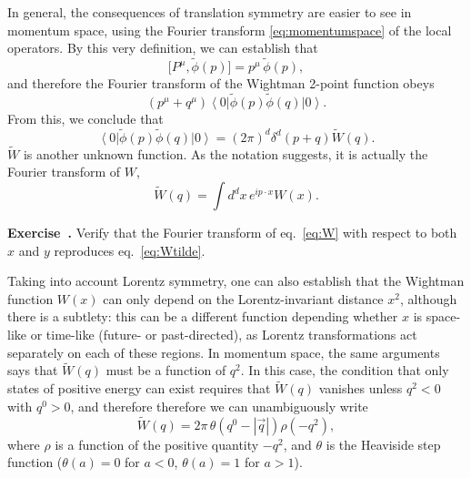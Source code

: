 \documentclass[a4paper,12pt]{article}
\newcommand{\ket}[1]{\left| #1 \right\rangle}
\newcommand{\bra}[1]{\left\langle #1 \right|}
\numberwithin{equation}{section}
\newcounter{exercise}[section]
\newenvironment{exercise}[1][]%
	{\refstepcounter{exercise}\bigskip
	\begin{mdframed}[backgroundcolor=gray!20, linewidth=0]
	\noindent\textbf{Exercise~\thesection.\theexercise #1} \rmfamily}
  	{\end{mdframed}\bigskip}
\begin{document}
In general, the consequences of translation symmetry are easier to see in momentum space, using the Fourier transform \eqref{eq:momentumspace} of the local operators. By this very definition, we can establish that
\begin{equation}
	\big[ P^\mu, \widetilde{\phi}(p) \big]
	= p^\mu \, \widetilde{\phi}(p),
	\label{eq:commutator:P:momentum}
\end{equation}
and therefore the Fourier transform of the Wightman 2-point function obeys
\begin{equation}
	(p^\mu + q^\mu)
	\bra{0} \widetilde{\phi}(p) \widetilde{\phi}(q) \ket{0}.
\end{equation}
From this, we conclude that
\begin{equation}
	\bra{0} \widetilde{\phi}(p) \widetilde{\phi}(q) \ket{0}
	= (2\pi)^d \delta^d(p + q) \widetilde{W}(q).
	\label{eq:Wtilde}
\end{equation}
$\widetilde{W}$ is another unknown function. As the notation suggests, it is actually the Fourier transform of $W$,
\begin{equation}
	\widetilde{W}(q) = \int d^dx \, e^{i p \cdot x} W(x).
\end{equation}
%
\begin{exercise}
	Verify that the Fourier transform of eq.~\eqref{eq:W}
	with respect to both $x$ and $y$ reproduces eq.~\eqref{eq:Wtilde}.
\end{exercise}



Taking into account Lorentz symmetry, one can also establish that the Wightman function $W(x)$ can only depend on the Lorentz-invariant distance $x^2$, although there is a subtlety: this can be a different function depending whether $x$ is space-like or time-like (future- or past-directed), as Lorentz transformations act separately on each of these regions.
In momentum space, the same arguments says that $\widetilde{W}(q)$ must be a function of $q^2$. In this case, the condition that only states of positive energy can exist requires that $\widetilde{W}(q)$ vanishes unless $q^2 < 0$ with $q^0 > 0$, and therefore therefore we can unambiguously write
\begin{equation}
	\widetilde{W}(q)
	= 2\pi \, \theta\left( q^0 - \left| \vec{q} \right| \right)
	\rho(-q^2),
	\label{eq:spectraldensity}
\end{equation}
where $\rho$ is a function of the positive quantity $-q^2$, and $\theta$ is the Heaviside step function ($\theta(a) = 0$ for $a < 0$, $\theta(a) = 1$ for $a > 1$).
\end{document}
